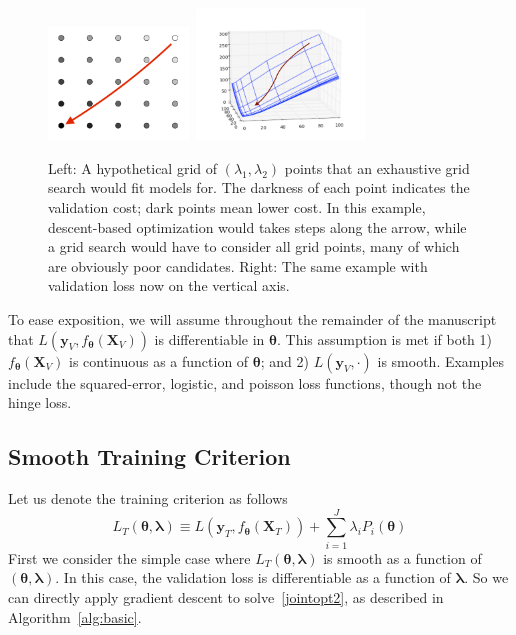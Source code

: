 \documentclass{statsoc}
\begin{document}
\begin{figure}
\centering
\includegraphics[height=30mm]{grid_search_vs_descent.pdf}
\includegraphics[height=35mm]{surface_in_regularization_parameters.pdf}
\caption{Left: A hypothetical grid of $(\lambda_1,\lambda_2)$ points that an exhaustive grid search would fit models for. The darkness of each point indicates the validation cost; dark points mean lower cost. In this example, descent-based optimization would takes steps along the arrow, while a grid search would have to consider all grid points, many of which are obviously poor candidates. Right: The same example with validation loss now on the vertical axis.}
\label{fig:compare}
\end{figure}

To ease exposition, we will assume throughout the remainder of the manuscript that $L \left( \boldsymbol{y}_V, f_{\boldsymbol \theta}(\boldsymbol{X}_V) \right)$ is differentiable in $\boldsymbol \theta$. This assumption is met if both 1) $f_{\boldsymbol \theta}(\boldsymbol{X}_V)$ is continuous as a function of $\boldsymbol \theta$; and 2) $L\left(\boldsymbol{y}_V,\cdot\right)$ is smooth. Examples include the squared-error, logistic, and poisson loss functions, though not the hinge loss.

\subsection{Smooth Training Criterion}
Let us denote the training criterion as follows
\begin{equation}
L_T\left(\boldsymbol \theta, \boldsymbol{\lambda}\right) \equiv L(\boldsymbol{y}_T, f_{\boldsymbol \theta} (\boldsymbol{X}_T)) + \sum\limits_{i=1}^J \lambda_i P_i(\boldsymbol \theta)
\label{train}
\end{equation}
First we consider the simple case where $L_T\left(\boldsymbol \theta, \boldsymbol{\lambda}\right)$ is smooth as a function of $(\boldsymbol \theta, \boldsymbol{\lambda})$. In this case, the validation loss is differentiable as a function of $\boldsymbol{\lambda}$. So we can directly apply gradient descent to solve~\eqref{jointopt2}, as described in Algorithm~\ref{alg:basic}.
\end{document}
